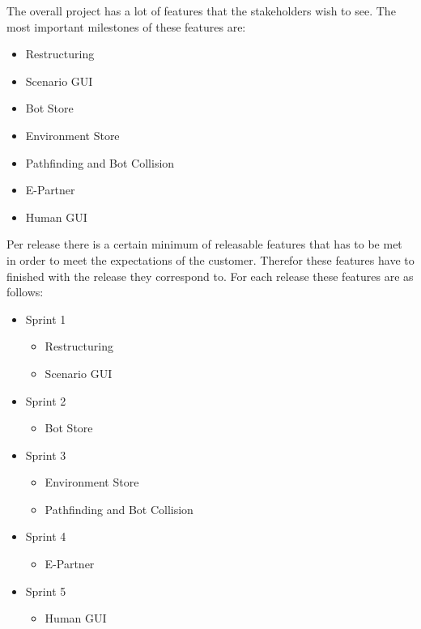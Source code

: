 \begin{description}
\item{}
The overall project has a lot of features that the stakeholders wish to see. The most important milestones of these features are:
\begin{itemize}
	\item Restructuring
	\item Scenario GUI
	\item Bot Store
	\item Environment Store
	\item Pathfinding and Bot Collision
	\item E-Partner
	\item Human GUI
\end{itemize}

Per release there is a certain minimum of releasable features that has to be met in order to meet the expectations of the customer. Therefor these features have to finished with the release they correspond to. For each release these features are as follows:
\begin{itemize}
	\item Sprint 1
	\begin{itemize}
		\item Restructuring
		\item Scenario GUI
	\end{itemize}
	\item Sprint 2
	\begin{itemize}
		\item Bot Store
	\end{itemize}
	\item Sprint 3
	\begin{itemize}
		\item Environment Store
		\item Pathfinding and Bot Collision
	\end{itemize}
	\item Sprint 4
	\begin{itemize}
		\item E-Partner
	\end{itemize}
	\item Sprint 5
	\begin{itemize}
		\item Human GUI
	\end{itemize}
\end{itemize}


\end{description}
